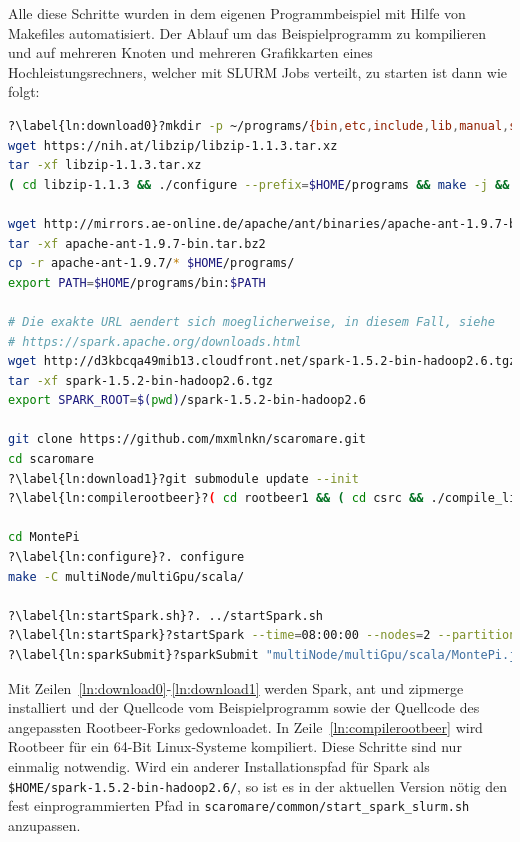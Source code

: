 Alle diese Schritte wurden in dem eigenen Programmbeispiel\cite{scaromare} mit Hilfe von Makefiles automatisiert.
Der Ablauf um das Beispielprogramm zu kompilieren und auf mehreren Knoten und mehreren Grafikkarten eines Hochleistungsrechners, welcher mit SLURM Jobs verteilt, zu starten ist dann wie folgt:
\begin{lstlisting}[language=Bash, caption={Arbeitsfluss von der Kompilation zur ersten Ausführung}, escapechar=? ]
?\label{ln:download0}?mkdir -p ~/programs/{bin,etc,include,lib,manual,share}
wget https://nih.at/libzip/libzip-1.1.3.tar.xz
tar -xf libzip-1.1.3.tar.xz
( cd libzip-1.1.3 && ./configure --prefix=$HOME/programs && make -j && make install )

wget http://mirrors.ae-online.de/apache/ant/binaries/apache-ant-1.9.7-bin.tar.bz2
tar -xf apache-ant-1.9.7-bin.tar.bz2
cp -r apache-ant-1.9.7/* $HOME/programs/
export PATH=$HOME/programs/bin:$PATH

# Die exakte URL aendert sich moeglicherweise, in diesem Fall, siehe
# https://spark.apache.org/downloads.html
wget http://d3kbcqa49mib13.cloudfront.net/spark-1.5.2-bin-hadoop2.6.tgz
tar -xf spark-1.5.2-bin-hadoop2.6.tgz
export SPARK_ROOT=$(pwd)/spark-1.5.2-bin-hadoop2.6

git clone https://github.com/mxmlnkn/scaromare.git
cd scaromare
?\label{ln:download1}?git submodule update --init
?\label{ln:compilerootbeer}?( cd rootbeer1 && ( cd csrc && ./compile_linux_x64 ) && ant jar && ./pack-rootbeer )

cd MontePi
?\label{ln:configure}?. configure
make -C multiNode/multiGpu/scala/

?\label{ln:startSpark.sh}?. ../startSpark.sh
?\label{ln:startSpark}?startSpark --time=08:00:00 --nodes=2 --partition=gpu2 --cpus-per-task=4 --gres='gpu:4'
?\label{ln:sparkSubmit}?sparkSubmit "multiNode/multiGpu/scala/MontePi.jar" 26832154321 4 2>&1 | sed '/ INFO /d'
\end{lstlisting}
Mit Zeilen~\ref{ln:download0}-\ref{ln:download1} werden Spark, ant und zipmerge installiert und der Quellcode vom Beispielprogramm sowie der Quellcode des angepassten Rootbeer-Forks gedownloadet.
In Zeile~\ref{ln:compilerootbeer} wird Rootbeer für ein 64-Bit Linux-Systeme kompiliert.
Diese Schritte sind nur einmalig notwendig.
Wird ein anderer Installationspfad für Spark als \lstinline!$HOME/spark-1.5.2-bin-hadoop2.6/!, so ist es in der aktuellen Version nötig den fest einprogrammierten Pfad in \lstinline!scaromare/common/start_spark_slurm.sh! anzupassen.

